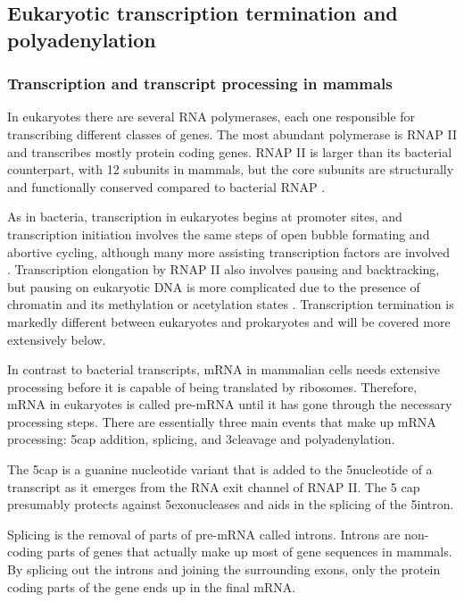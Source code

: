 %

\subsection{Eukaryotic transcription termination and polyadenylation}

\subsubsection{Transcription and transcript processing in mammals}
In eukaryotes there are several RNA polymerases, each one responsible for
transcribing different classes of genes. The most abundant polymerase is 
RNAP II and transcribes mostly protein coding genes. RNAP II is larger than its
bacterial counterpart, with 12 subunits in mammals, but the core subunits are
structurally and functionally conserved compared to bacterial RNAP
\cite{ebright_rna_2000}.

As in bacteria, transcription in eukaryotes begins at promoter sites, and
transcription initiation involves the same steps of open bubble formating and
abortive cycling, although many more assisting transcription factors are
involved \cite{wade_transition_2008}. Transcription elongation by RNAP II also
involves pausing and backtracking, but pausing on eukaryotic DNA is more
complicated due to the presence of chromatin and its methylation or acetylation
states \cite{sims_elongation_2004}. Transcription termination is markedly
different between eukaryotes and prokaryotes and will be covered more
extensively below.

In contrast to bacterial transcripts, mRNA in mammalian cells needs
extensive processing before it is capable of being translated by ribosomes.
Therefore, mRNA in eukaryotes is called pre-mRNA until it has gone through the
necessary processing steps. There are essentially three main events that make
up mRNA processing: 5\p cap addition, splicing, and 3\p cleavage and
polyadenylation.

The 5\p cap is a guanine nucleotide variant that is added to the 5\p nucleotide
of a transcript as it emerges from the RNA exit channel of RNAP II. The 5\p
cap presumably protects against 5\p exonucleases and aids in the splicing of
the 5\p intron.

Splicing is the removal of parts of pre-mRNA called introns. Introns are
non-coding parts of genes that actually make up most of gene sequences in
mammals. By splicing out the introns and joining the surrounding exons, only
the protein coding parts of the gene ends up in the final mRNA.

